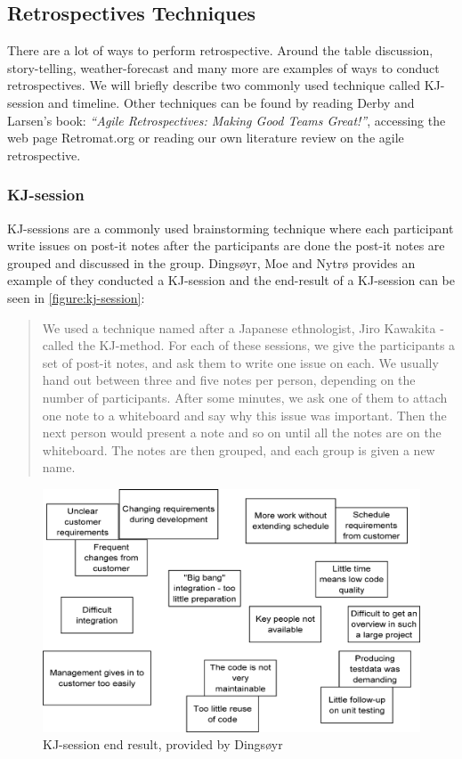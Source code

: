 \subsection{Retrospectives Techniques}
There are a lot of ways to perform retrospective. Around the table discussion, story-telling, weather-forecast and many more are examples of ways to conduct retrospectives. We will briefly describe two commonly used technique called KJ-session and timeline. Other techniques can be found by reading Derby and Larsen's book\cite{Larsen2006}: \textit{``Agile Retrospectives: Making Good Teams Great!''}, accessing the web page Retromat.org\cite{retromat2015} or reading our own literature review on the agile retrospective\cite{Dolvik2014}. 

\subsubsection{KJ-session}
KJ-sessions are a commonly used brainstorming technique where each participant write issues on post-it notes after the participants are done the post-it notes are grouped and discussed in the group. Dingsøyr, Moe and Nytrø\cite{Moe2001} provides an example of they conducted a KJ-session and the end-result of a KJ-session can be seen in \autoref{figure:kj-session}: 

\begin{quote}
We used a technique named after a Japanese ethnologist, Jiro
Kawakita - called the KJ-method. For each of these sessions,
we give the participants a set of post-it notes, and ask them to
write one issue on each. We usually hand out between three and
five notes per person, depending on the number of participants.
After some minutes, we ask one of them to attach one note to a
whiteboard and say why this issue was important. Then the next
person would present a note and so on until all the notes are on
the whiteboard. The notes are then grouped, and each group is
given a new name. 
\end{quote}

\begin{figure}[!h]
	\centering
	\includegraphics[width=\textwidth, keepaspectratio]{figures/KJ-session.png}
	\caption{KJ-session end result, provided by Dingsøyr\cite{Dingsoyr2004}}
	\label{figure:kj-session}
\end{figure}

